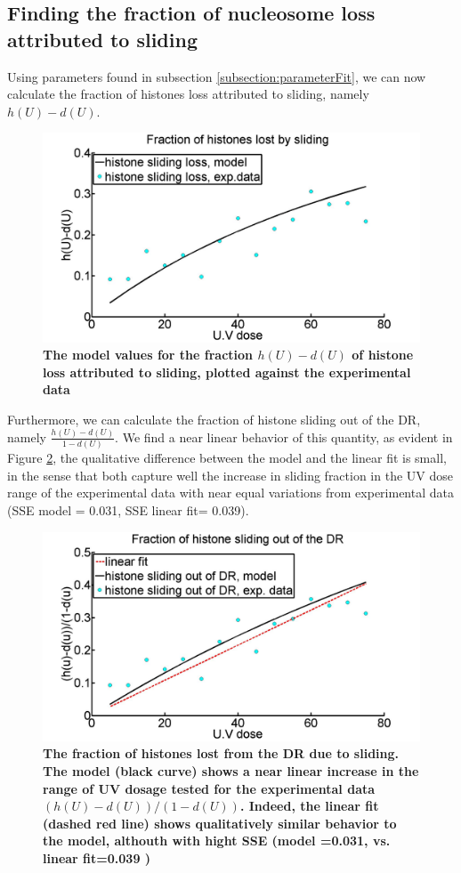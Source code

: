 \documentclass[12pt]{article}
\newcommand{\beq}{\begin{eqnarray}}
\newcommand{\eeq}{\end{eqnarray}}
\begin{document}
\subsection{Finding the fraction of nucleosome loss attributed to sliding}


Using parameters found in subsection \ref{subsection:parameterFit}, we can now calculate the fraction of histones loss attributed to sliding, namely $h(U)-d(U)$.

\begin{figure}[H]
\centering
\includegraphics[width=0.5\linewidth, height=0.3\textheight]{hVsUVDoseModelFit01}
\caption{\textbf{The model values for the fraction $h(U)-d(U)$ of histone loss attributed to sliding, plotted against the experimental data}}
\label{fig:hVsUVDoseModelFit01}
\end{figure}

Furthermore, we can calculate the fraction of histone sliding out of the DR, namely $\frac{h(U)-d(U)}{1-d(U)}$. We find a near linear behavior of this quantity, as evident
in Figure \ref{fig:histoneSlideFromDamageRegionComparision}, the qualitative difference between the model and the linear fit is small, in the sense that both capture well the increase in sliding fraction in the UV dose range of the experimental data with near equal variations from experimental data (SSE model = 0.031, SSE linear fit= 0.039).

\begin{figure}[H]
	\centering
	\includegraphics[width=0.7\linewidth, height=0.3\textheight]{histoneSlideFromDamageRegionComparision}
	\caption{\textbf{The fraction of histones lost from the DR due to sliding. The model (black curve) shows a near linear increase in the range of UV dosage tested for the experimental data $(h(U)-d(U))/(1-d(U))$. Indeed, the linear fit (dashed red line) shows qualitatively similar behavior to the model, althouth with hight SSE (model =0.031, vs. linear fit=0.039 ) }}
	\label{fig:histoneSlideFromDamageRegionComparision}
\end{figure}
\end{document}
